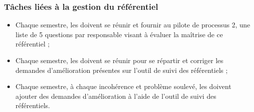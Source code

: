 \subsubsection*{Tâches liées à la gestion du référentiel}

\begin{itemize}
	\item Chaque semestre, les \RQs doivent se réunir et fournir au pilote de processus 2, une liste de 5 questions par responsable visant à évaluer la maîtrise de ce référentiel ;
	\item Chaque semestre, les \RQs doivent se réunir pour se répartir et corriger les demandes d’amélioration présentes sur l’outil de suivi des référentiels ;
	\item Chaque semestre, à chaque incohérence et problème soulevé, les \RQs doivent ajouter des demandes d’amélioration à l’aide de l’outil de suivi des référentiels.
\end{itemize}






